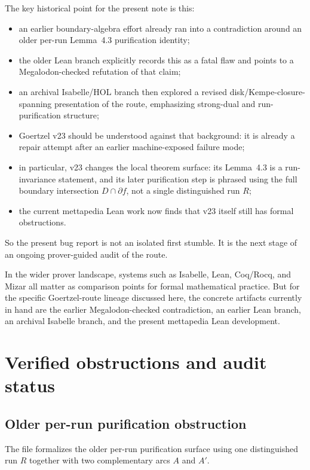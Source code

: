 \documentclass[11pt]{article}
\begin{document}
The key historical point for the present note is this:
\begin{itemize}[leftmargin=2em]
\item an earlier boundary-algebra effort already ran into a contradiction around
an older per-run Lemma~4.3 purification identity;
\item the older Lean branch explicitly records this as a fatal flaw and points
to a Megalodon-checked refutation of that claim;
\item an archival Isabelle/HOL branch then explored a revised
disk/Kempe-closure-spanning presentation of the route, emphasizing strong-dual
and run-purification structure;
\item Goertzel v23 should be understood against that background: it is already a
repair attempt after an earlier machine-exposed failure mode;
\item in particular, v23 changes the local theorem surface: its Lemma~4.3 is a
run-invariance statement, and its later purification step is phrased using the
full boundary intersection \(D \cap \partial f\), not a single distinguished
run \(R\);
\item the current mettapedia Lean work now finds that v23 itself still has
formal obstructions.
\end{itemize}

So the present bug report is not an isolated first stumble.  It is the next
stage of an ongoing prover-guided audit of the route.

In the wider prover landscape, systems such as Isabelle, Lean, Coq/Rocq, and
Mizar all matter as comparison points for formal mathematical practice.  But
for the specific Goertzel-route lineage discussed here, the concrete artifacts
currently in hand are the earlier Megalodon-checked contradiction, an earlier
Lean branch, an archival Isabelle branch, and the present mettapedia Lean
development.

\section{Verified obstructions and audit status}

\subsection{Older per-run purification obstruction}

The file
formalizes the older per-run purification surface using one distinguished run
\(R\) together with two complementary arcs \(A\) and \(A'\).
\end{document}
